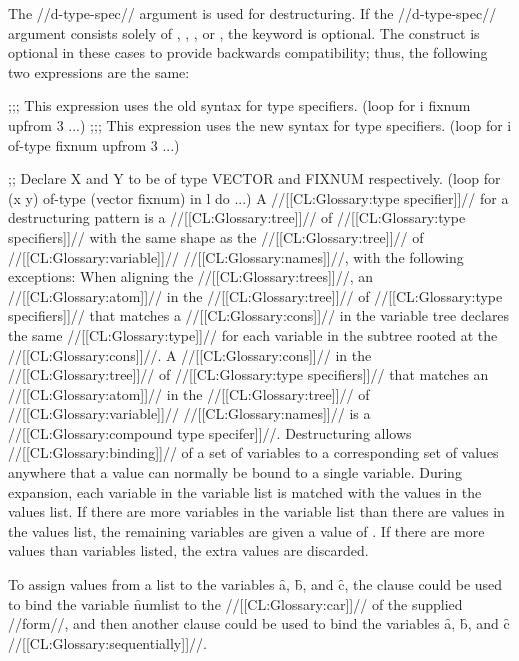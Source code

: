 The //d-type-spec// argument is used for destructuring. If the //d-type-spec// argument consists solely of , , , or \nil, the  keyword is optional. The  construct is optional in these cases to provide backwards compatibility; thus, the following two expressions are the same:

\code ;;; This expression uses the old syntax for type specifiers.
 (loop for i fixnum upfrom 3 ...)
  ;;; This expression uses the new syntax for type specifiers.
 (loop for i of-type fixnum upfrom 3 ...)

;; Declare X and Y to be of type VECTOR and FIXNUM respectively.
 (loop for (x y) of-type (vector fixnum) 
       in l do ...) \endcode
  A //[[CL:Glossary:type specifier]]// for a destructuring pattern is a //[[CL:Glossary:tree]]// of  //[[CL:Glossary:type specifiers]]// with the same shape as the //[[CL:Glossary:tree]]// of //[[CL:Glossary:variable]]// //[[CL:Glossary:names]]//, with the following exceptions:
  \beginlist  \itemitem{\bull} When aligning the //[[CL:Glossary:trees]]//, an //[[CL:Glossary:atom]]// in the //[[CL:Glossary:tree]]// of //[[CL:Glossary:type specifiers]]// that matches a //[[CL:Glossary:cons]]//  in the variable tree declares the same //[[CL:Glossary:type]]// for each variable in the subtree rooted at the //[[CL:Glossary:cons]]//.
  \itemitem{\bull}  A //[[CL:Glossary:cons]]// in the //[[CL:Glossary:tree]]// of //[[CL:Glossary:type specifiers]]// that  matches an //[[CL:Glossary:atom]]// in the //[[CL:Glossary:tree]]// of //[[CL:Glossary:variable]]// //[[CL:Glossary:names]]// is a //[[CL:Glossary:compound type specifer]]//.
  \endlist
  Destructuring allows //[[CL:Glossary:binding]]// of a set of variables to a corresponding set of values anywhere that a value can normally be bound to a single variable.  During  expansion,  each variable in the variable list is matched with the values in the values list.  If there are more variables in the variable list than there are values in the values list, the  remaining variables are given a value of \nil.  If there are more values than variables listed, the extra values are discarded.

  To assign values from a list to the variables \f{a}, \f{b}, and \f{c}, the  clause could be used to bind the variable \f{numlist} to the  //[[CL:Glossary:car]]// of the supplied //form//, and then another  clause could be used to bind the variables \f{a}, \f{b}, and \f{c} //[[CL:Glossary:sequentially]]//.  

